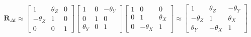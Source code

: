 \begin{align}
\mathbf{R}_{\Delta t} \approx 
\begin{bmatrix}
1 &  \theta_Z & 0\\
-\theta_Z &  1& 0\\
0 &  0 & 1
\end{bmatrix}
\begin{bmatrix}
1 &  0 & -\theta_Y\\
0 &  1 & 0\\
\theta_Y &  0 & 1 
\end{bmatrix}
\begin{bmatrix}
1 &  0 & 0\\
0 & 1 &  \theta_X \\
0 &  -\theta_X &  1 
\end{bmatrix}
\approx
\begin{bmatrix}
1 &  \theta_Z & -\theta_Y\\
-\theta_Z & 1 &  \theta_X \\
\theta_Y &  -\theta_X &  1 
\end{bmatrix}
\end{align}

